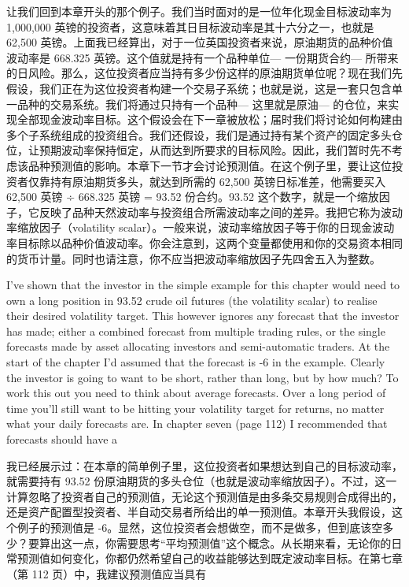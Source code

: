 \begin{chineseblock}让我们回到本章开头的那个例子。我们当时面对的是一位年化现金目标波动率为 1,000,000 英镑的投资者，这意味着其日目标波动率是其十六分之一，也就是 62,500 英镑。上面我已经算出，对于一位英国投资者来说，原油期货的品种价值波动率是 668.325 英镑。这个值就是持有一个品种单位--- 一份期货合约--- 所带来的日风险。那么，这位投资者应当持有多少份这样的原油期货单位呢？现在我们先假设，我们正在为这位投资者构建一个交易子系统；也就是说，这是一套只包含单一品种的交易系统。我们将通过只持有一个品种--- 这里就是原油--- 的仓位，来实现全部现金波动率目标。这个假设会在下一章被放松；届时我们将讨论如何构建由多个子系统组成的投资组合。我们还假设，我们是通过持有某个资产的固定多头仓位，让预期波动率保持恒定，从而达到所要求的目标风险。因此，我们暂时先不考虑该品种预测值的影响。本章下一节才会讨论预测值。在这个例子里，要让这位投资者仅靠持有原油期货多头，就达到所需的 62,500 英镑日标准差，他需要买入 62,500 英镑 ÷ 668.325 英镑 = 93.52 份合约。93.52 这个数字，就是一个缩放因子，它反映了品种天然波动率与投资组合所需波动率之间的差异。我把它称为波动率缩放因子（volatility scalar）。一般来说，波动率缩放因子等于你的日现金波动率目标除以品种价值波动率。你会注意到，这两个变量都使用和你的交易资本相同的货币计量。同时也请注意，你不应当把波动率缩放因子先四舍五入为整数。\end{chineseblock}


\begin{englishblock} I've shown that the investor in the simple example for this chapter would need to own a long position in 93.52 crude oil futures (the volatility scalar) to realise their desired volatility target. This however ignores any forecast that the investor has made; either a combined forecast from multiple trading rules, or the single forecasts made by asset allocating investors and semi-automatic traders. At the start of the chapter I'd assumed that the forecast is -6 in the example. Clearly the investor is going to want to be short, rather than long, but by how much? To work this out you need to think about average forecasts. Over a long period of time you'll still want to be hitting your volatility target for returns, no matter what your daily forecasts are. In chapter seven (page 112) I recommended that forecasts should have a \end{englishblock}

\begin{chineseblock}我已经展示过：在本章的简单例子里，这位投资者如果想达到自己的目标波动率，就需要持有 93.52 份原油期货的多头仓位（也就是波动率缩放因子）。不过，这一计算忽略了投资者自己的预测值，无论这个预测值是由多条交易规则合成得出的，还是资产配置型投资者、半自动交易者所给出的单一预测值。本章开头我假设，这个例子的预测值是 -6。显然，这位投资者会想做空，而不是做多，但到底该空多少？要算出这一点，你需要思考“平均预测值”这个概念。从长期来看，无论你的日常预测值如何变化，你都仍然希望自己的收益能够达到既定波动率目标。在第七章（第 112 页）中，我建议预测值应当具有\end{chineseblock}

